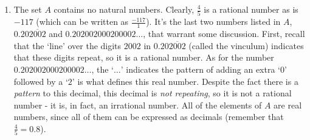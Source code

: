{\begin{enumerate}

\smallskip

So suppose $s \in S$.  What can be said about $s$?  We know there is some real number $x$ so that $s = x^2$.  Since $x^2 \geq 0$ for any real number $x$, we know $s \geq 0$.  This tells us that everything in $S$ is a non-negative real number.  This begs the question:  are \underline{all} of the non-negative real numbers in $S$?  Suppose $n$ is a non-negative real number, that is, $n \geq 0$.  If $n$ were in $S$, there would be a real number $x$ so that $x^2=n$.  As you may recall, we can solve $x^2 = n$ by `extracting square roots':  $x = \pm \sqrt{n}$.  Since $n \geq 0$, $\sqrt{n}$ is a real number. Moreover, $(\sqrt{n})^2 = n$ so $n$ is the square of a real number which means $n \in S$. Hence, $S$ is the set of non-negative real numbers.

\item  The set $A$ contains no natural numbers. Clearly, $\frac{4}{5}$ is a rational number as is $-117$ (which can be written as $\frac{-117}{1}$). It's the last two numbers listed in $A$, $0.20\overline{2002}$ and $0.202002000200002 \ldots$, that warrant some discussion.  First, recall that the `line' over the digits $2002$ in $0.20\overline{2002}$ (called the vinculum) indicates that these digits repeat, so it is a rational number. As for the number $0.202002000200002 \ldots$, the `$\ldots$' indicates the pattern of adding an extra `$0$' followed by a `$2$' is what defines this real number.  Despite the fact there is a \textit{pattern} to this decimal, this decimal is \textit{not repeating}, so it is not a rational number - it is, in fact, an irrational number.  All of the elements of $A$ are real numbers, since all of them can be expressed as decimals (remember that $\frac{4}{5} = 0.8$).



\end{enumerate}
}

